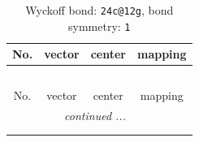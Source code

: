 \documentclass[fleqn,8pt]{jsarticle}
\begin{document}
\renewcommand{\arraystretch}{1.2}
\begin{longtable}{cccc}
\caption{Wyckoff bond: {\tt 24c@12g}, bond symmetry: {\tt 1}}
 \\
 \hline \hline
No. & vector & center & mapping \\ \hline \endfirsthead

\multicolumn{3}{l}{\tablename\ \thetable{}} \\
 \hline \hline
No. & vector & center & mapping \\ \hline \endhead

 \hline \hline
\multicolumn{3}{r}{\footnotesize\it continued ...} \\ \endfoot

 \hline \hline
\multicolumn{3}{r}{} \\ \endlastfoot


\end{longtable}
\end{document}
